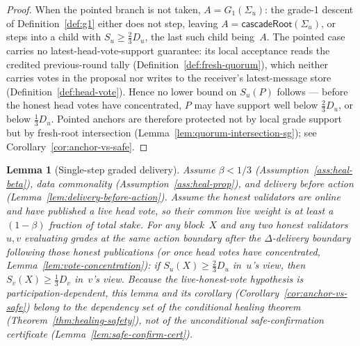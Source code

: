 \ifx\litemode\undefined\documentclass{article}\fi
\newcommand{\Supp}{\ensuremath{S}}          %
\newcommand{\Dvote}{\ensuremath{D}}         %
\newcommand{\Gone}{\ensuremath{G_{1}}}
\newcommand{\cascadeRoot}{\textsf{cascadeRoot}\xspace}
\theoremstyle{plain}
\newtheorem{lemma}{Lemma}
\theoremstyle{definition}
\theoremstyle{remark}
\begin{document}
\begin{proof}
When the pointed branch is not taken, \(A = \Gone(\Sigma_u)\): the grade-1 descent
of Definition~\ref{def:g1} either does not step, leaving
\(A = \cascadeRoot(\Sigma_u)\), or steps into a child with
\(\Supp_u \geq \tfrac{2}{3}\Dvote_u\), the last such child being~\(A\).
The pointed case carries no latest-head-vote-support guarantee: its local
acceptance reads the credited previous-round tally
(Definition~\ref{def:fresh-quorum}), which neither carries votes in the
proposal nor writes to the receiver's latest-message store
(Definition~\ref{def:head-vote}).  Hence no lower bound on
\(\Supp_u(P)\) follows --- before the honest head votes have
concentrated, \(P\) may have support well below
\(\tfrac23\Dvote_u\), or below \(\tfrac13\Dvote_u\).  Pointed anchors are therefore
protected not by local grade support but by fresh-root intersection
(Lemma~\ref{lem:quorum-intersection-sg}); see Corollary~\ref{cor:anchor-vs-safe}.
\end{proof}

\begin{lemma}[Single-step graded delivery]\label{lem:graded-delivery}
Assume \(\beta < 1/3\) (Assumption~\ref{ass:heal-beta}), data commonality
(Assumption~\ref{ass:heal-prop}), and delivery before action
(Lemma~\ref{lem:delivery-before-action}).  Assume the honest validators are
online and have published a live head vote, so their common live weight is at
least a \((1-\beta)\) fraction of total stake.  For any block~\(X\) and any two
honest validators \(u, v\) evaluating grades at the same action boundary after
the \(\Delta\)-delivery boundary following those honest publications (or once
head votes have concentrated, Lemma~\ref{lem:vote-concentration}): if
\(\Supp_u(X) \geq \tfrac{2}{3}\Dvote_u\)
in~\(u\)'s view, then \(\Supp_v(X) \geq \tfrac{1}{3}\Dvote_v\) in~\(v\)'s view.
Because the live-honest-vote hypothesis is participation-dependent, this lemma
and its corollary (Corollary~\ref{cor:anchor-vs-safe}) belong to the dependency
set of the conditional healing theorem (Theorem~\ref{thm:healing-safety}), not of
the unconditional safe-confirmation certificate (Lemma~\ref{lem:safe-confirm-cert}).
\end{lemma}
\end{document}
